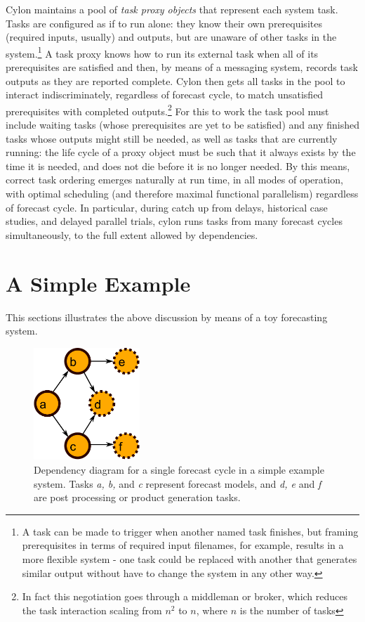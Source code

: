 \documentclass[11pt,a4paper]{article}
\begin{document}
Cylon maintains a pool of {\em task proxy objects} that represent each
system task. Tasks are configured as if to run alone: they know their
own prerequisites (required inputs, usually) and outputs, but are
unaware of other tasks in the system.\footnote{A task can be made to
trigger when another named task finishes, but framing prerequisites in
terms of required input filenames, for example, results in a more
flexible system - one task could be replaced with another that generates
similar output without have to change the system in any other way.} A
task proxy knows how to run its external task when all of its
prerequisites are satisfied and then, by means of a messaging system,
records task outputs as they are reported complete. Cylon then gets all
tasks in the pool to interact indiscriminately, regardless of forecast
cycle, to match unsatisfied prerequisites with completed
outputs.\footnote{In fact this negotiation goes through a middleman or
broker, which reduces the task interaction scaling from $n^2$ to $n$,
where $n$ is the number of tasks} For this to work the task pool must
include waiting tasks (whose prerequisites are yet to be satisfied) and
any finished tasks whose outputs might still be needed, as well as tasks
that are currently running: the life cycle of a proxy object must be
such that it always exists by the time it is needed, and does not die
before it is no longer needed. By this means, correct task ordering
emerges naturally at run time, in all modes of operation, with optimal
scheduling (and therefore maximal functional parallelism) regardless of
forecast cycle. In particular, during catch up from delays, historical
case studies, and delayed parallel trials, cylon runs tasks from many
forecast cycles simultaneously, to the full extent allowed by
dependencies.

\section{A Simple Example}

This sections illustrates the above discussion by means of a toy
forecasting system.

\begin{figure} 
    \begin{center}
    \includegraphics[width=4cm]{dependencies-one} 
    \end{center}
    \caption{\small Dependency diagram for a single forecast cycle in a
    simple example system. Tasks {\em a, b,} and {\em c} represent
    forecast models, and {\em d, e} and {\em f} are post processing or
    product generation tasks.} 
    \label{fig-dep-one} 
\end{figure} 
\end{document}
